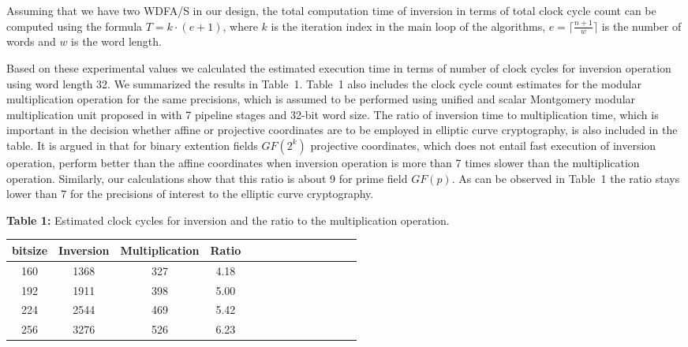\documentclass[twocolumn]{IEEEtran}
\begin{document}
Assuming that we have two WDFA/S in our design, the total computation time 
of inversion in terms of total clock cycle count can be computed using the 
formula $T = k \cdot (e+1)$,
where $k$ is the iteration index in the main loop of the algorithms, 
$e=\lceil \frac {n+1} {w} \rceil$ is the number of words and $w$ is 
the word length.

Based on these experimental values we calculated the estimated 
execution time in terms of number of clock cycles for inversion operation 
using word length 32. We summarized the results in Table~1.
Table~1 also includes the clock cycle count estimates for
the modular multiplication operation for the same precisions, which is 
assumed to be performed using unified and scalar Montgomery modular 
multiplication unit proposed in \cite{STK00:A} with 7 pipeline 
stages and 32-bit word size. The ratio of inversion time
to multiplication time, which is important in the decision 
whether affine or projective coordinates are to be
employed in elliptic curve cryptography, is also included in the
table. It is argued in \cite{LD99:Fast} that for binary extention
fields $GF(2^k)$ projective 
coordinates, which does not entail fast execution of inversion
operation, perform better than the affine coordinates when
inversion operation is more than 7 times slower than the multiplication
operation. Similarly, our calculations show that this ratio is about 9 
for prime field $GF(p)$. As can be observed in Table~1 the ratio stays lower
than 7 for the precisions of interest to the elliptic curve 
cryptography.

\begin{center}
\textbf{Table 1:} Estimated clock cycles for inversion and the ratio 
to the multiplication operation. \\[1em]
\begin{tabular}{|c|c|c|c|c|c|c|c|c|c|c|c|c|c|} \hline
bitsize & Inversion & Multiplication & Ratio  \\ \hline
160 & 1368  & 327 & 4.18 \\ \hline
192 & 1911  & 398 & 5.00 \\ \hline
224 & 2544  & 469 & 5.42 \\ \hline
256 & 3276  & 526 & 6.23 \\ \hline
\end{tabular}
\end{center}
\end{document}
